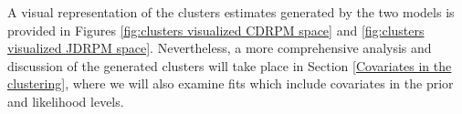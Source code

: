 \documentclass[12pt,	%
	a4paper,		%
	twoside,		%
	openright,		%
	titlepage,%
	]{book}
\theoremstyle{definition}
\begin{document}

A visual representation of the clusters estimates generated by the two models is provided in Figures \ref{fig:clusters visualized CDRPM space} and \ref{fig:clusters visualized JDRPM space}. Nevertheless, a more comprehensive analysis and discussion of the generated clusters will take place in Section \ref{Covariates in the clustering}, where we will also examine fits which include covariates in the prior and likelihood levels.



\end{document}
